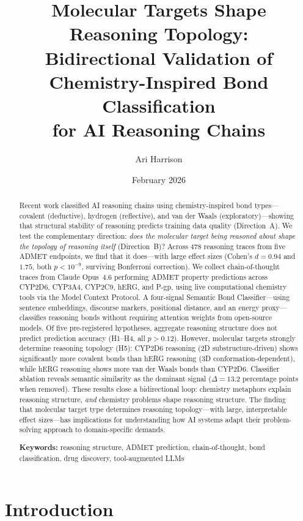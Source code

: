 \documentclass[11pt]{article}
\title{Molecular Targets Shape Reasoning Topology: \\
Bidirectional Validation of Chemistry-Inspired Bond Classification \\
for AI Reasoning Chains}
\author[1]{Ari Harrison}
\affil[1]{NovoQuant Nexus}
\date{February 2026}
\begin{document}
\maketitle

\begin{abstract}
Recent work classified AI reasoning chains using chemistry-inspired bond types---covalent (deductive), hydrogen (reflective), and van der Waals (exploratory)---showing that structural stability of reasoning predicts training data quality (Direction~A). We test the complementary direction: \emph{does the molecular target being reasoned about shape the topology of reasoning itself} (Direction~B)? Across 478 reasoning traces from five ADMET endpoints, we find that it does---with large effect sizes (Cohen's $d = 0.94$ and $1.75$, both $p < 10^{-9}$, surviving Bonferroni correction). We collect chain-of-thought traces from Claude Opus~4.6 performing ADMET property predictions across CYP2D6, CYP3A4, CYP2C9, hERG, and P-gp, using live computational chemistry tools via the Model Context Protocol. A four-signal Semantic Bond Classifier---using sentence embeddings, discourse markers, positional distance, and an energy proxy---classifies reasoning bonds without requiring attention weights from open-source models. Of five pre-registered hypotheses, aggregate reasoning structure does not predict prediction accuracy (H1--H4, all $p > 0.12$). However, molecular targets strongly determine reasoning topology (H5): CYP2D6 reasoning (2D substructure-driven) shows significantly more covalent bonds than hERG reasoning (3D conformation-dependent), while hERG reasoning shows more van der Waals bonds than CYP2D6. Classifier ablation reveals semantic similarity as the dominant signal ($\Delta = 13.2$ percentage points when removed). These results close a bidirectional loop: chemistry metaphors explain reasoning structure, \emph{and} chemistry problems shape reasoning structure. The finding that molecular target type determines reasoning topology---with large, interpretable effect sizes---has implications for understanding how AI systems adapt their problem-solving approach to domain-specific demands.

\medskip
\noindent\textbf{Keywords:} reasoning structure, ADMET prediction, chain-of-thought, bond classification, drug discovery, tool-augmented LLMs
\end{abstract}

\section{Introduction}
\label{sec:intro}
\end{document}
